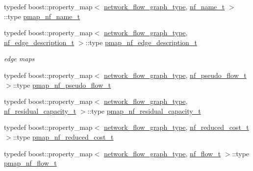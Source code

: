 \begin{DoxyCompactItemize}
\item 
typedef boost\+::property\+\_\+map$<$ \hyperlink{classnetwork__flow_abfdb8d1baba183c2b121f8c078b9b640}{network\+\_\+flow\+\_\+graph\+\_\+type}, \hyperlink{structnetwork__flow_1_1nf__name__t}{nf\+\_\+name\+\_\+t} $>$\+::type \hyperlink{classnetwork__flow_a86d192070fc0f9d58337b45c30855c6f}{pmap\+\_\+nf\+\_\+name\+\_\+t}
\item 
typedef boost\+::property\+\_\+map$<$ \hyperlink{classnetwork__flow_abfdb8d1baba183c2b121f8c078b9b640}{network\+\_\+flow\+\_\+graph\+\_\+type}, \hyperlink{structnetwork__flow_1_1nf__edge__description__t}{nf\+\_\+edge\+\_\+description\+\_\+t} $>$\+::type \hyperlink{classnetwork__flow_a1ea6b2ccbcafb4ecd4d6fb0e64b53350}{pmap\+\_\+nf\+\_\+edge\+\_\+description\+\_\+t}
\begin{DoxyCompactList}\small\item\em edge maps \end{DoxyCompactList}\item 
typedef boost\+::property\+\_\+map$<$ \hyperlink{classnetwork__flow_abfdb8d1baba183c2b121f8c078b9b640}{network\+\_\+flow\+\_\+graph\+\_\+type}, \hyperlink{structnetwork__flow_1_1nf__pseudo__flow__t}{nf\+\_\+pseudo\+\_\+flow\+\_\+t} $>$\+::type \hyperlink{classnetwork__flow_ae2897f4e40c2208d05a1939f4c2f626f}{pmap\+\_\+nf\+\_\+pseudo\+\_\+flow\+\_\+t}
\item 
typedef boost\+::property\+\_\+map$<$ \hyperlink{classnetwork__flow_abfdb8d1baba183c2b121f8c078b9b640}{network\+\_\+flow\+\_\+graph\+\_\+type}, \hyperlink{structnetwork__flow_1_1nf__residual__capacity__t}{nf\+\_\+residual\+\_\+capacity\+\_\+t} $>$\+::type \hyperlink{classnetwork__flow_a853061022784c1835c390a91e1691839}{pmap\+\_\+nf\+\_\+residual\+\_\+capacity\+\_\+t}
\item 
typedef boost\+::property\+\_\+map$<$ \hyperlink{classnetwork__flow_abfdb8d1baba183c2b121f8c078b9b640}{network\+\_\+flow\+\_\+graph\+\_\+type}, \hyperlink{structnetwork__flow_1_1nf__reduced__cost__t}{nf\+\_\+reduced\+\_\+cost\+\_\+t} $>$\+::type \hyperlink{classnetwork__flow_a54ee3bb5e8f6488106a18c778c2ab92e}{pmap\+\_\+nf\+\_\+reduced\+\_\+cost\+\_\+t}
\item 
typedef boost\+::property\+\_\+map$<$ \hyperlink{classnetwork__flow_abfdb8d1baba183c2b121f8c078b9b640}{network\+\_\+flow\+\_\+graph\+\_\+type}, \hyperlink{structnetwork__flow_1_1nf__flow__t}{nf\+\_\+flow\+\_\+t} $>$\+::type \hyperlink{classnetwork__flow_ab39a2916cb880c6ee352ff76b2378514}{pmap\+\_\+nf\+\_\+flow\+\_\+t}
\item 

\end{DoxyCompactItemize}
